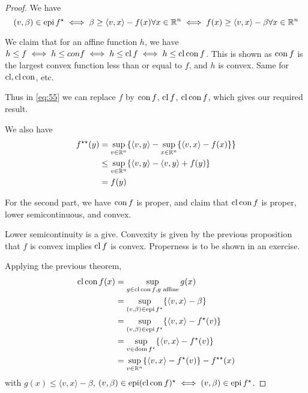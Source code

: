 \begin{proof}
  We have
  \begin{equation}
    \label{eq:55}
    (v, \beta) \in \operatorname*{epi} f^{\star} \iff \beta \geq \langle v, x
    \rangle - f(x) \forall x \in \mathbb{R}^{n} \iff f(x) \geq \langle v, x
    \rangle - \beta \forall x \in \mathbb{R}^{n}
  \end{equation}

  We claim that for an affine function $h$, we have $h \leq f \iff h
  \leq con f \iff h \leq \operatorname*{cl} f \iff h \leq \operatorname*{cl} \operatorname*{con} f$. This is shown
  as $\operatorname*{con} f$ is the largest convex function less than or equal to
  $f$, and $h$ is convex. Same for $\operatorname*{cl}, \operatorname*{cl} \operatorname*{con}$, etc.

  Thus in \eqref{eq:55} we can replace $f$ by $\operatorname*{con} f$, $\operatorname*{cl} f$, $\operatorname*{cl}
  \operatorname*{con} f$, which gives our required result.

  We also have
  \begin{align}
    \label{eq:56}
    f^{\star \star}(y) & = \sup_{v \in \mathbb{R}^{n}} \{ \langle v, y \rangle - \sup_{x \in \mathbb{R}^{n}}  \{ \langle v, x \rangle - f(x) \} \} \\
                       & \leq \sup_{v \in \mathbb{R}^{n}} \{ \langle v, y \rangle - \langle v, y  \rangle + f(y) \} \\
                       & = f(y)
 \end{align}
                     
  
  For the second part, we have $\operatorname*{con} f$ is proper, and claim that $\operatorname*{cl}
  \operatorname*{con} f$ is proper, lower semicontinuous, and convex.

  Lower semicontinuity is a give.  Convexity is given by the previous
  proposition that $f$ is convex implies $\operatorname*{cl} f$ is convex.
  Properness is to be shown in an exercise.

  Applying the previous theorem,
  \begin{align}
    \label{eq:57}
    \operatorname*{cl} \operatorname*{con} f(x) &= \sup_{g \in \operatorname*{cl} \operatorname*{con} f, \text{$g$ affine}} g(x) \\
    &= \sup_{(v, \beta) \in \operatorname*{epi} f^{\star}} \{ \langle v, x \rangle - \beta \}
  \\
    &= \sup_{(v, \beta) \in \operatorname*{epi} f^{\star}} \{ \langle v, x \rangle -
    f^{\star}(v) \} \\
    &= \sup_{v \in \operatorname*{dom} f^{\star}} \{ \langle v, x \rangle -
    f^{\star}(v) \} \\
    &= \sup_{v \in \mathbb{R}^{n}} \{ \langle v, x \rangle - f^{\star}(v) \} -
    f^{\star \star}(x)
  \end{align}
  with $g(x) \leq \langle v, x \rangle - \beta$, $(v, \beta) \in \operatorname*{epi} (\operatorname*{cl} \operatorname*{con} f)^{\star} \iff (v, \beta) \in \operatorname*{epi} f^{\star}$.


\end{proof}
